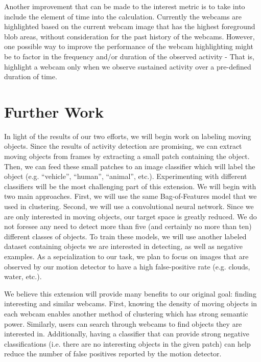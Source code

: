 \documentclass{article}
\begin{document}
Another improvement that can be made to the interest metric is to take into
include the element of time into the calculation. Currently the webcams are
highlighted based on the current webcam image that has the highest foreground
blob areas, without consideration for the past history of the webcams. However,
one possible way to improve the performance of the webcam highlighting might be
to factor in the frequency and/or duration of the observed activity - That is,
highlight a webcam only when we observe sustained activity over a pre-defined
duration of time. 

\section{Further Work}
In light of the results of our two efforts, we will begin work on labeling
moving objects. Since the results of activity detection are promising, we can
extract moving objects from frames by extracting a small patch containing the
object. Then, we can feed these small patches to an image classifier which will
label the object (e.g. ``vehicle'', ``human'', ``animal'', etc.). Experimenting
with different classifiers will be the most challenging part of this extension.
We will begin with two main approaches. First, we will use the same
Bag-of-Features model that we used in clustering.  Second, we will use a
convolutional neural network. Since we are only interested in moving objects,
our target space is greatly reduced. We do not foresee any need to detect more
than five (and certainly no more than ten) different classes of objects. To
train these models, we will use another labeled dataset containing objects we
are interested in detecting, as well as negative examples. As a sepcialization
to our task, we plan to focus on images that are observed by our motion
detector to have a high false-positive rate (e.g. clouds, water, etc.).

We believe this extension will provide many benefits to our original goal:
finding interesting and similar webcams. First, knowing the density of moving
objects in each webcam enables another method of clustering which has strong
semantic power. Similarly, users can search through webcams to find objects
they are interested in. Additionally, having a classifier that can provide
strong negative classifications (i.e. there are no interesting objects in the
given patch) can help reduce the number of false positives reported by the
motion detector.

\newpage
\end{document}
